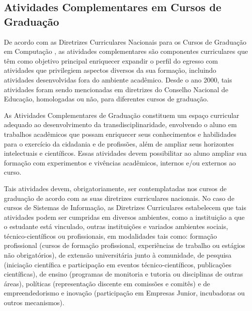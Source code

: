 \documentclass[12pt]{article}
\begin{document}
\subsection{Atividades Complementares em Cursos de Graduação}

De acordo com as Diretrizes Curriculares Nacionais para os Cursos de Graduação em Computação \cite{parecer:136}, as atividades complementares são componentes curriculares que têm como objetivo principal enriquecer expandir o perfil do egresso com atividades que privilegiem aspectos diversos da sua formação, incluindo atividades desenvolvidas fora do ambiente acadêmico. Desde o ano 2000, tais atividades foram sendo mencionadas em diretrizes do Conselho Nacional de Educação, homologadas ou não, para diferentes cursos de graduação.

	As Atividades Complementares de Graduação constituem um espaço curricular adequado ao desenvolvimento da transdisciplinaridade, envolvendo o aluno em trabalhos acadêmicos que possam enriquecer seus conhecimentos e habilidades para o exercício da cidadania e de profissões, além de ampliar seus horizontes intelectuais e científicos. Essas atividades devem possibilitar ao aluno ampliar sua formação com experimentos e vivências acadêmicos, internos e/ou externos ao curso.

Tais atividades devem, obrigatoriamente, ser contemplatadas nos cursos de graduação de acordo com as suas diretrizes curriculares nacionais. No caso de cursos de Sistemas de Informação, as Diretrizes Curriculares estabelecem que tais atividades podem ser cumpridas em diversos ambientes, como a instituição a que o estudante está vinculado, outras instituições e variados ambientes sociais, técnico-científicos ou profissionais, em modalidades tais como: formação profissional (cursos de formação profissional, experiências de trabalho ou estágios não obrigatórios), de extensão universitária junto à comunidade, de pesquisa (iniciação científica e participação em eventos técnico-científicos, publicações científicas), de ensino (programas de monitoria e tutoria ou disciplinas de outras áreas), políticas (representação discente em comissões e comitês) e de empreendedorismo e inovação (participação em Empresas Junior, incubadoras ou outros mecanismos).
\end{document}
